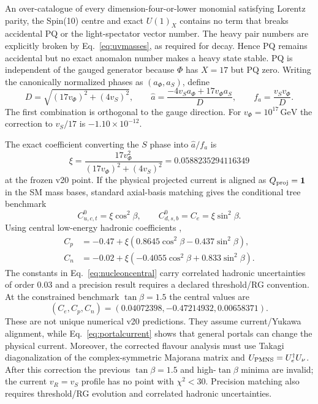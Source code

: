 \documentclass[11pt,a4paper]{article}
\newcommand{\GeV}{\,\mathrm{GeV}}
\begin{document}
An over-catalogue of every dimension-four-or-lower monomial satisfying
Lorentz parity, the Spin(10) centre and exact $U(1)_X$ contains no term
that breaks accidental PQ or the light-spectator vector number. The heavy
pair numbers are explicitly broken by Eq.~\eqref{eq:uvmasses}, as required
for decay. Hence PQ remains accidental but no exact anomalon number makes a
heavy state stable. PQ is independent of the gauged generator because
$\Phi$ has $X=17$ but PQ zero.
Writing the canonically normalized phases as $(a_\Phi,a_S)$, define
\begin{equation}
 D=\sqrt{(17v_\Phi)^2+(4v_S)^2},\qquad
 \widehat a=\frac{-4v_Sa_\Phi+17v_\Phi a_S}{D},\qquad
 f_a=\frac{v_Sv_\Phi}{D}.
\label{eq:axionprojection}
\end{equation}
The first combination is orthogonal to the gauge direction. For
$v_\Phi=10^{17}\GeV$ the correction to $v_S/17$ is
$-1.10\times10^{-12}$.

The exact coefficient converting the $S$ phase into $\widehat a/f_a$ is
\begin{equation}
 \xi=\frac{17v_\Phi^2}{(17v_\Phi)^2+(4v_S)^2}
 =0.0588235294116349
\label{eq:xiexact}
\end{equation}
at the frozen v20 point. If the physical projected current is aligned as
$Q_{\rm proj}=\mathbf1$ in the SM mass bases, standard axial-basis matching
gives the conditional tree benchmark
\begin{equation}
 C^0_{u,c,t}=\xi\cos^2\!\beta,\qquad
 C^0_{d,s,b}=C_e=\xi\sin^2\!\beta.
\label{eq:fermiontreeexact}
\end{equation}
Using central low-energy hadronic coefficients \cite{GrillidiCortona},
\begin{align}
 C_p&=-0.47+\xi(0.8645\cos^2\!\beta-0.437\sin^2\!\beta),\nonumber\\
 C_n&=-0.02+\xi(-0.4055\cos^2\!\beta+0.833\sin^2\!\beta).
\label{eq:nucleoncentral}
\end{align}
The constants in Eq.~\eqref{eq:nucleoncentral} carry correlated hadronic
uncertainties of order $0.03$ and a precision result requires a declared
threshold/RG convention. At the constrained benchmark $\tan\beta=1.5$ the
central values are
\begin{equation}
 (C_e,C_p,C_n)=(0.04072398,-0.47214932,0.00658371).
\end{equation}
These are not unique numerical v20 predictions. They assume current/Yukawa
alignment, while Eq.~\eqref{eq:portalcurrent} shows that general portals can
change the physical current. Moreover, the corrected flavour analysis must
use Takagi diagonalization of the complex-symmetric Majorana matrix and
$U_{\rm PMNS}=U_e^\dagger U_\nu$. After this correction the previous
$\tan\beta=1.5$ and high-$\tan\beta$ minima are invalid; the current
$v_R=v_S$ profile has no point with $\chi^2<30$. Precision matching also
requires threshold/RG evolution and correlated hadronic uncertainties.
\end{document}
